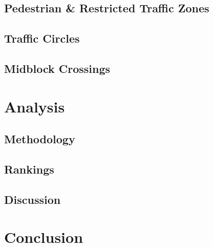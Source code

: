 \documentclass[titlepage,oneside]{article}
\begin{document}
	\subsection{Pedestrian \& Restricted Traffic Zones}
	
	\clearpage
	
	\subsection{Traffic Circles}
	
	\clearpage

	\subsection{Midblock Crossings}
	
	\clearpage

\section{Analysis}

	\subsection{Methodology}
	
	\clearpage
	
	\subsection{Rankings}
	
	\clearpage
	
	\subsection{Discussion}
	
	\clearpage

\section{Conclusion}

\clearpage

\nocite{*}
{}

\clearpage





\end{document}
